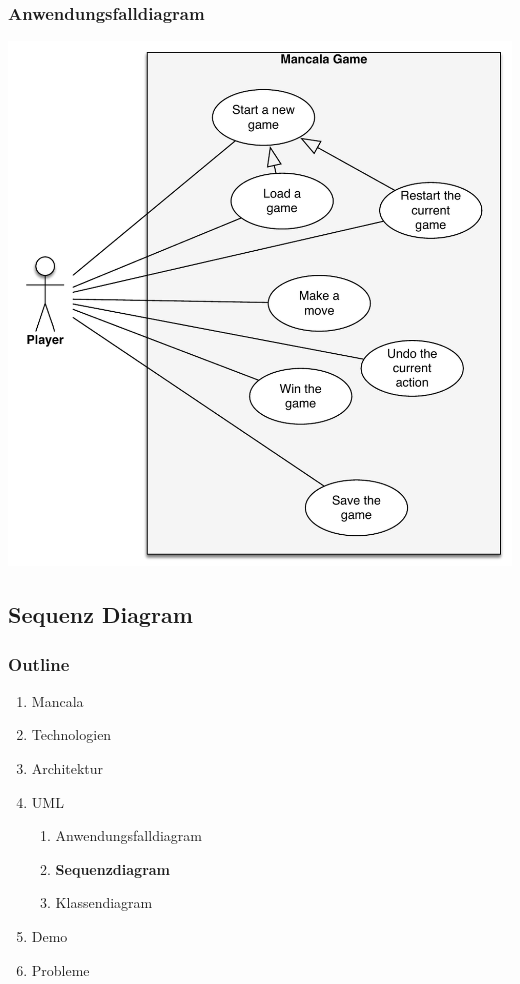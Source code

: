 \documentclass[
	10pt,
	t		%
]{beamer}
\begin{document}
\begin{frame}
\frametitle{Anwendungsfalldiagram}
\begin{center}
\includegraphics[scale=0.32]{./../Diagrams/UseCases.pdf}
\end{center}
\end{frame}

\subsection{Sequenz Diagram}
\begin{frame}
\frametitle{Outline}
\begin{enumerate}
\item Mancala
\item Technologien
\item Architektur
\item UML
\begin{enumerate}
\item Anwendungsfalldiagram
\item \textbf{Sequenzdiagram}
\item Klassendiagram
\end{enumerate}
\item Demo
\item Probleme
\end{enumerate}
\end{frame}
\end{document}
